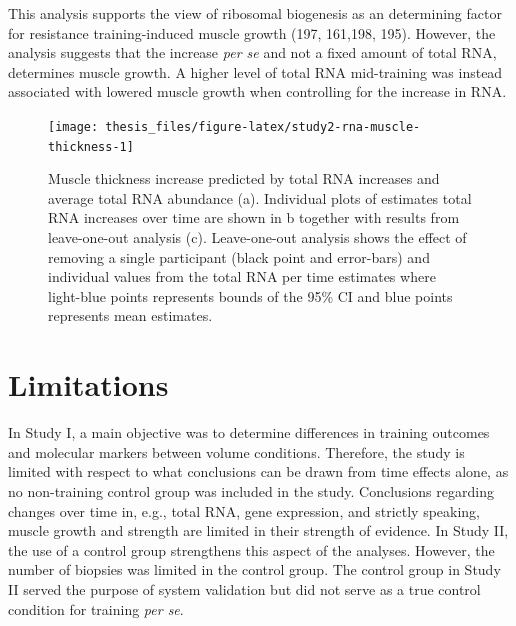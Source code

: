 \documentclass[twoside,10pt]{gihclass} %
\begin{document}
This analysis supports the view of ribosomal biogenesis as an determining factor for resistance training-induced muscle growth
(197, 161,198,
195).
However, the analysis suggests that the increase \emph{per se} and not a fixed amount of total RNA, determines muscle growth.
A higher level of total RNA mid-training was instead associated with lowered muscle growth when controlling for the increase in RNA.
\begin{figure}

{\centering \texttt{[image: thesis\_files/figure-latex/study2-rna-muscle-thickness-1]} 

}

\caption[Relationship between total RNA and muscle hypertrophy in Study II]{Muscle thickness increase predicted by total RNA increases and average total RNA abundance (a). Individual plots of estimates total RNA increases over time are shown in b together with results from leave-one-out analysis (c). Leave-one-out analysis shows the effect of removing a single participant (black point and error-bars) and individual values from the total RNA per time estimates where light-blue points represents bounds of the 95\% CI and blue points represents mean estimates.}\label{fig:study2-rna-muscle-thickness}
\end{figure}
\hypertarget{limitations}{%
\section{Limitations}\label{limitations}}

In Study I, a main objective was to determine differences in training outcomes and molecular markers between volume conditions. Therefore, the study is limited with respect to what conclusions can be drawn from time effects alone, as no non-training control group was included in the study. Conclusions regarding changes over time in, e.g., total RNA, gene expression, and strictly speaking, muscle growth and strength are limited in their strength of evidence.
In Study II, the use of a control group strengthens this aspect of the analyses. However, the number of biopsies was limited in the control group. The control group in Study II served the purpose of system validation but did not serve as a true control condition for training \emph{per se}.
\end{document}
